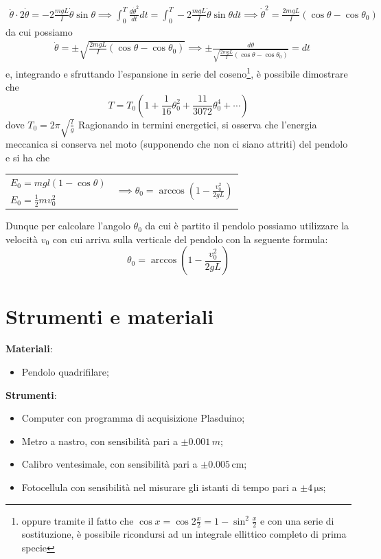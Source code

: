 \documentclass{article}
\begin{document}
	\begin{align*}
		\ddot{\theta} \cdot 2 \dot{\theta} = -2\frac{mgL}{I}\dot{\theta}\sin{\theta} \implies \int_0^T \frac{d\dot{\theta}^2}{dt} dt = \int_0^T -2\frac{mgL}{I}\dot{\theta}\sin{\theta} dt \implies \dot{\theta}^2 = \frac{2mgL}{I}(\cos{\theta} - \cos{\theta_0})
	\end{align*}
	da cui possiamo 
	\begin{align*}
		&\dot{\theta} = \pm \sqrt{\frac{2mgL}{I}(\cos{\theta} - \cos{\theta_0})} \implies \pm \frac{d\theta}{\sqrt{\frac{2mgL}{I}(\cos{\theta} - \cos{\theta_0})} } = dt
	\end{align*}
	e, integrando e sfruttando l'espansione in serie del coseno\footnote{oppure tramite il fatto che $\cos{x} = \cos{2\frac{x}{2}} = 1 - \sin^2{\frac{x}{2}}$ e con una serie di sostituzione, è possibile ricondursi ad un integrale ellittico completo di prima specie}, è possibile dimostrare che
	\begin{equation}
		T = T_0 \left( 1 + \frac{1}{16}\theta_0^2 + \frac{11}{3072}\theta_0^4 + \cdots \right)
	\end{equation}
	dove $T_0 = 2\pi\sqrt{\frac{l}{g}}$
	Ragionando in termini energetici, si osserva che l'energia meccanica si conserva nel moto (supponendo che non ci siano attriti) del pendolo e si ha che

\begin{table}[H]
    \centering
    \begin{tabular}{l c}
        $E_0 = mgl(1-\cos{\theta})$ & \multirow{2}{*}{$\implies \theta_0 = \arccos{ \left(1 - \frac{v_0^2}{2gL} \right)}$} \\
         $E_0 = \frac{1}{2}mv_0^2$ &  \\
    \end{tabular}
\end{table}

\noindent Dunque per calcolare l'angolo $\theta_0$ da cui è partito il pendolo possiamo utilizzare la velocità $v_0$ con cui arriva sulla verticale del pendolo con la seguente formula:
\begin{equation} \label{eq:angolo}
	\theta_0 = \arccos{\left(1- \frac{v_0^2}{2gL} \right) }
\end{equation}
	\section{Strumenti e materiali}
	\textbf{Materiali}:
	\begin{itemize}
		\item Pendolo quadrifilare;
	\end{itemize}
	\textbf{Strumenti}:
	\begin{itemize}
		\item Computer con programma di acquisizione Plasduino;
		\item Metro a nastro, con sensibilità pari a $\pm 0.001 \, \si{m}$;
		\item Calibro ventesimale, con sensibilità pari a $\pm 0.005 \, \si{\centi\meter}$;
		\item Fotocellula con sensibilità nel misurare gli istanti di tempo pari a $\pm 4 \, \si{\micro\second}$;
	\end{itemize}
\end{document}
